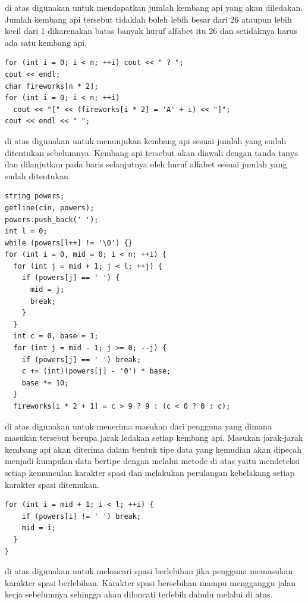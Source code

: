 \documentclass{subfiles}
\begin{document}
{\Script} di atas digunakan untuk mendapatkan jumlah kembang api yang akan diledakan. Jumlah kembang api tersebut tidaklah boleh lebih besar dari 26 ataupun lebih kecil dari 1 dikarenakan batas banyak huruf alfabet itu 26 dan setidaknya harus ada satu kembang api.

\begin{code}
\begin{verbatim}
for (int i = 0; i < n; ++i) cout << " ? ";
cout << endl;
char fireworks[n * 2];
for (int i = 0; i < n; ++i)
  cout << "[" << (fireworks[i * 2] = 'A' + i) << "]";
cout << endl << " ";
\end{verbatim}
\end{code}

{\Script} di atas digunakan untuk menunjukan kembang api sesuai jumlah yang sudah ditentukan sebelumnya. Kembang api tersebut akan diawali dengan tanda tanya dan dilanjutkan pada baris selanjutnya oleh huruf alfabet sesuai jumlah yang sudah ditentukan.

\begin{code}
\begin{verbatim}
string powers;
getline(cin, powers);
powers.push_back(' ');
int l = 0;
while (powers[l++] != '\0') {}
for (int i = 0, mid = 0; i < n; ++i) {
  for (int j = mid + 1; j < l; ++j) {
    if (powers[j] == ' ') {
      mid = j;
      break;
    }
  }
  int c = 0, base = 1;
  for (int j = mid - 1; j >= 0; --j) {
    if (powers[j] == ' ') break;
    c += (int)(powers[j] - '0') * base;
    base *= 10;
  }
  fireworks[i * 2 + 1] = c > 9 ? 9 : (c < 0 ? 0 : c);
\end{verbatim}
\end{code}

{\Script} di atas digunakan untuk menerima masukan dari pengguna yang dimana masukan tersebut berupa jarak ledakan setiap kembang api. Masukan jarak-jarak kembang api akan diterima dalam bentuk tipe data  yang kemudian akan dipecah menjadi kumpulan data bertipe  dengan melalui metode di atas yaitu mendeteksi setiap kemunculan karakter spasi dan melakukan perulangan kebelakang setiap karakter spasi ditemukan.

\begin{code}
\begin{verbatim}
for (int i = mid + 1; i < l; ++i) {
    if (powers[i] != ' ') break;
    mid = i;
  }
}
\end{verbatim}
\end{code}

{\Script} di atas digunakan untuk meloncari spasi berlebihan jika pengguna memasukan karakter spasi berlebihan. Karakter spasi bersebihan mampu mengganggu jalan kerja {\script} sebelumnya sehingga akan diloncati terlebih dahulu melalui {\script} di atas.
\end{document}
